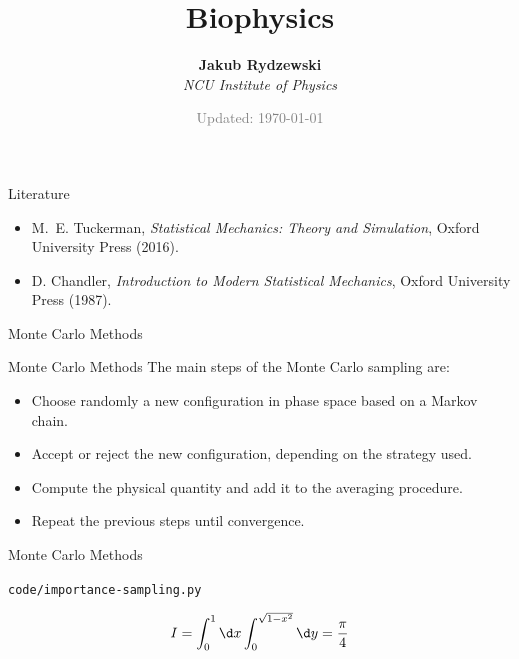 \documentclass[10pt]{beamer}
\title{Biophysics}
\author{\textbf{Jakub Rydzewski}\\[5pt]
  \footnotesize{\it NCU Institute of Physics}}
\date{\footnotesize\textcolor{gray}{Updated: \today}}
\begin{document}
{\frame{\titlepage}}

\begin{frame}{Literature}
\begin{itemize}
\setlength\itemsep{1em}
  \item M.~E. Tuckerman, \textit{Statistical Mechanics: Theory and Simulation}, Oxford University Press (2016).
  \item D. Chandler, \textit{Introduction to Modern Statistical Mechanics}, Oxford University Press (1987).
\end{itemize}
\end{frame}


\begin{frame}{}
  \begin{center}
    \fontsize{25pt}{6}\selectfont\vspace{1.2cm}
    \textcolor{subtitle}{Monte Carlo Methods}
  \end{center}
\end{frame}

\begin{frame}{Monte Carlo Methods}
The main steps of the Monte Carlo sampling are:
\vspace*{0.5cm}
\begin{itemize}
\setlength\itemsep{1em}
  \item Choose randomly a new configuration in phase space based on a Markov chain.
  \item Accept or reject the new configuration, depending on the strategy used.
  \item Compute the physical quantity and add it to the averaging procedure.
  \item Repeat the previous steps until convergence.
\end{itemize}
\end{frame}

\begin{frame}{Monte Carlo Methods}

\texttt{code/importance-sampling.py}

\begin{equation}
  I = \int_0^1\d x \int_0^{\sqrt{1-x^2}}\d y = \frac{\pi}{4}
\end{equation}
\end{frame}
\end{document}
